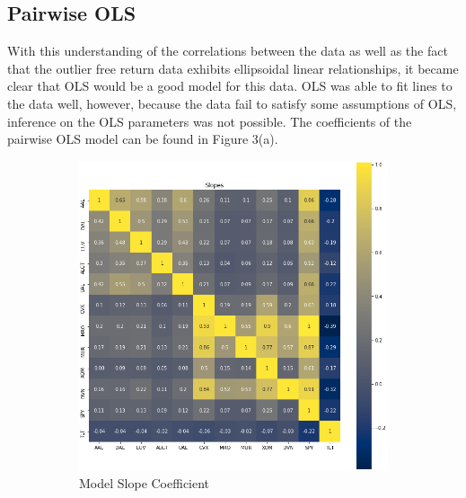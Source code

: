 \documentclass{article}
\begin{document}
\subsection{Pairwise OLS}
With this understanding of the correlations between the data as well as the fact that
the outlier free return data exhibits ellipsoidal linear relationships, it became clear
that OLS would be a good model for this data. OLS was able to fit lines to the data well,
however, because the data fail to satisfy some assumptions of OLS, inference on the 
OLS parameters was not possible. The coefficients of the pairwise OLS model can be found
in Figure 3(a).
\begin{figure}[h!]
  \centering
  \begin{subfigure}{.5\textwidth}
    \centering
    \includegraphics[width=.95\linewidth]{../Figures/pair_reg_slope.png}
    \caption{Model Slope Coefficient}
  \end{subfigure}%
  \begin{subfigure}{.5\textwidth}
    \centering

\end{subfigure}
\end{figure}
\end{document}
